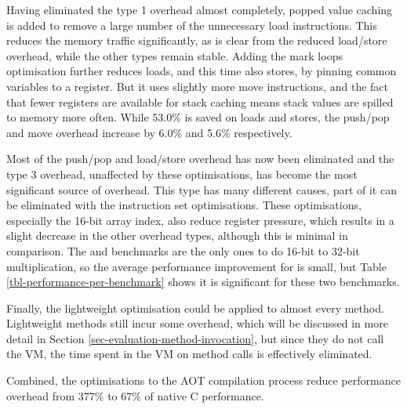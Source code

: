 Having eliminated the type 1 overhead almost completely, popped value caching is added to remove a large number of the unnecessary load instructions. This reduces the memory traffic significantly, as is clear from the reduced load/store overhead, while the other types remain stable. Adding the mark loops optimisation further reduces loads, and this time also stores, by pinning common variables to a register. But it uses slightly more move instructions, and the fact that fewer registers are available for stack caching means stack values are spilled to memory more often. While 53.0\% is saved on loads and stores, the push/pop and move overhead increase by 6.0\% and 5.6\% respectively.

Most of the push/pop and load/store overhead has now been eliminated and the type 3 overhead, unaffected by these optimisations, has become the most significant source of overhead. This type has many different causes, part of it can be eliminated with the instruction set optimisations. These optimisations, especially the 16-bit array index, also reduce register pressure, which results in a slight decrease in the other overhead types, although this is minimal in comparison. The  and  benchmarks are the only ones to do 16-bit to 32-bit multiplication, so the average performance improvement for  is small, but Table \ref{tbl-performance-per-benchmark} shows it is significant for these two benchmarks.

Finally, the lightweight optimisation could be applied to almost every method. Lightweight methods still incur some overhead, which will be discussed in more detail in Section \ref{sec-evaluation-method-invocation}, but since they do not call the VM, the time spent in the VM on method calls is effectively eliminated.

Combined, the optimisations to the AOT compilation process reduce performance overhead from 377\% to 67\% of native C performance.
